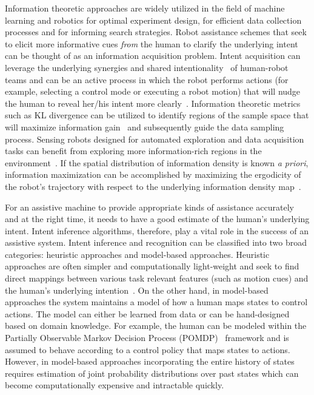 \documentclass[conference]{IEEEtran}
\begin{document}
Information theoretic approaches are widely utilized in the field of machine learning and robotics for optimal experiment design, for efficient data collection processes and for informing search strategies. Robot assistance schemes that seek to elicit more informative cues \textit{from} the human to clarify the underlying intent can be thought of as an information acquisition problem. Intent acquisition can leverage the underlying synergies and shared intentionality~\citep{tomasello2007shared} of human-robot teams and can be an active process in which the robot performs actions (for example, selecting a control mode or executing a robot motion) that will nudge the human to reveal her/his intent more clearly~\cite{sadigh2016information, sadigh2016planning}. Information theoretic metrics such as KL divergence can be utilized to identify regions of the sample space that will maximize information gain~\citep{tong2001active} and subsequently guide the data sampling process. Sensing robots designed for automated exploration and data acquisition tasks can benefit from exploring more information-rich regions in the environment~\citep{atanasov2014information}. If the spatial distribution of information density is known \textit{a priori}, information maximization can be accomplished by maximizing the ergodicity of the robot's trajectory with respect to the underlying information density map~\citep{miller2013trajectory, miller2016ergodic}. 

For an assistive machine to provide appropriate kinds of assistance accurately and at the right time, it needs to have a good estimate of the human's underlying intent. Intent inference algorithms, therefore, play a vital role in the success of an assistive system. Intent inference and recognition can be classified into two broad categories: heuristic approaches and model-based approaches. Heuristic approaches are often simpler and computationally light-weight and seek to find direct mappings between various task relevant features (such as motion cues) and the human's underlying intention~\citep{baker2007goal, baker2009action}. On the other hand, in model-based approaches the system maintains a model of how a human maps states to control actions. The model can either be learned from data or can be hand-designed based on domain knowledge. For example, the human can be modeled within the Partially Observable Markov Decision Process (POMDP)~\citep{dragan2013policy, taha2011pomdp} framework and is assumed to behave according to a control policy that maps states to actions. However, in model-based approaches incorporating the entire history of states requires estimation of joint probability distributions over past states which can become computationally expensive and intractable quickly.
\end{document}
